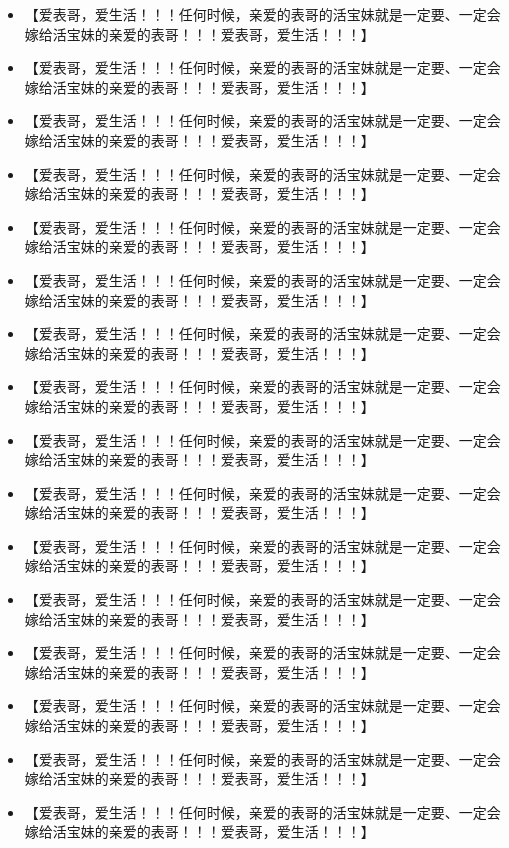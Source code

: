 \documentclass[9pt, b5paper]{article}
\begin{document}
\begin{itemize}
\item 【爱表哥，爱生活！！！任何时候，亲爱的表哥的活宝妹就是一定要、一定会嫁给活宝妹的亲爱的表哥！！！爱表哥，爱生活！！！】
\item 【爱表哥，爱生活！！！任何时候，亲爱的表哥的活宝妹就是一定要、一定会嫁给活宝妹的亲爱的表哥！！！爱表哥，爱生活！！！】
\item 【爱表哥，爱生活！！！任何时候，亲爱的表哥的活宝妹就是一定要、一定会嫁给活宝妹的亲爱的表哥！！！爱表哥，爱生活！！！】
\item 【爱表哥，爱生活！！！任何时候，亲爱的表哥的活宝妹就是一定要、一定会嫁给活宝妹的亲爱的表哥！！！爱表哥，爱生活！！！】
\item 【爱表哥，爱生活！！！任何时候，亲爱的表哥的活宝妹就是一定要、一定会嫁给活宝妹的亲爱的表哥！！！爱表哥，爱生活！！！】
\item 【爱表哥，爱生活！！！任何时候，亲爱的表哥的活宝妹就是一定要、一定会嫁给活宝妹的亲爱的表哥！！！爱表哥，爱生活！！！】
\item 【爱表哥，爱生活！！！任何时候，亲爱的表哥的活宝妹就是一定要、一定会嫁给活宝妹的亲爱的表哥！！！爱表哥，爱生活！！！】
\item 【爱表哥，爱生活！！！任何时候，亲爱的表哥的活宝妹就是一定要、一定会嫁给活宝妹的亲爱的表哥！！！爱表哥，爱生活！！！】
\item 【爱表哥，爱生活！！！任何时候，亲爱的表哥的活宝妹就是一定要、一定会嫁给活宝妹的亲爱的表哥！！！爱表哥，爱生活！！！】
\item 【爱表哥，爱生活！！！任何时候，亲爱的表哥的活宝妹就是一定要、一定会嫁给活宝妹的亲爱的表哥！！！爱表哥，爱生活！！！】
\item 【爱表哥，爱生活！！！任何时候，亲爱的表哥的活宝妹就是一定要、一定会嫁给活宝妹的亲爱的表哥！！！爱表哥，爱生活！！！】
\item 【爱表哥，爱生活！！！任何时候，亲爱的表哥的活宝妹就是一定要、一定会嫁给活宝妹的亲爱的表哥！！！爱表哥，爱生活！！！】
\item 【爱表哥，爱生活！！！任何时候，亲爱的表哥的活宝妹就是一定要、一定会嫁给活宝妹的亲爱的表哥！！！爱表哥，爱生活！！！】
\item 【爱表哥，爱生活！！！任何时候，亲爱的表哥的活宝妹就是一定要、一定会嫁给活宝妹的亲爱的表哥！！！爱表哥，爱生活！！！】
\item 【爱表哥，爱生活！！！任何时候，亲爱的表哥的活宝妹就是一定要、一定会嫁给活宝妹的亲爱的表哥！！！爱表哥，爱生活！！！】
\item 【爱表哥，爱生活！！！任何时候，亲爱的表哥的活宝妹就是一定要、一定会嫁给活宝妹的亲爱的表哥！！！爱表哥，爱生活！！！】

\end{itemize}
\end{document}
